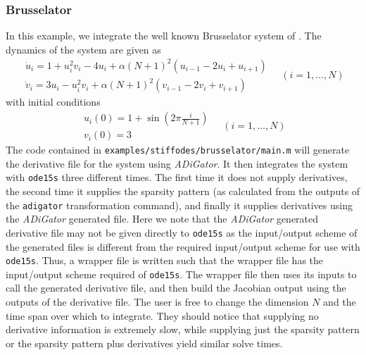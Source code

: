 \documentclass[10pt,pdftex]{article}
\begin{document}
\subsubsection{Brusselator}
In this example, we integrate the well known Brusselator system of \cite{wanner1991}. The dynamics of the system are given as
\begin{equation}
\begin{array}{l}
\dot{u}_i = 1 + u_i^2v_i - 4u_i + \alpha (N+1)^2(u_{i-1}-2u_i + u_{i+1}) \\
\dot{v}_i = 3u_i - u_i^2v_i + \alpha(N+1)^2(v_{i-1}-2v_i + v_{i+1})
\end{array}
\quad (i = 1,\dots,N)
\end{equation}
with initial conditions
\begin{equation}
\begin{array}{l}
u_i(0) = 1 + \sin\left(2\pi \frac{i}{N+1} \right) \\
v_i(0) = 3
\end{array}
\quad (i = 1,\dots,N)
\end{equation}
The code contained in \texttt{examples/stiffodes/brusselator/main.m} will generate the derivative file for the system using \emph{ADiGator}. It then integrates the system with \texttt{ode15s} three different times. The first time it does not supply derivatives, the second time it supplies the sparsity pattern (as calculated from the outputs of the \texttt{adigator} transformation command), and finally it supplies derivatives using the \emph{ADiGator} generated file. Here we note that the \emph{ADiGator} generated derivative file may not be given directly to \texttt{ode15s} as the input/output scheme of the generated files is different from the required input/output scheme for use with \texttt{ode15s}. Thus, a wrapper file is written such that the wrapper file has the input/output scheme required of \texttt{ode15s}. The wrapper file then uses its inputs to call the generated derivative file, and then build the Jacobian output using the outputs of the derivative file. The user is free to change the dimension $N$ and the time span over which to integrate. They should notice that supplying no derivative information is extremely slow, while supplying just the sparsity pattern or the sparsity pattern plus derivatives yield similar solve times.
\end{document}
